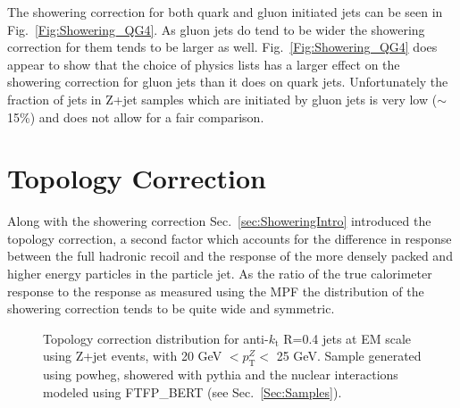 The showering correction for both quark and gluon initiated jets can be seen in Fig.~\ref{Fig:Showering_QG4}.  
As gluon jets do tend to be wider the showering correction for them tends to be larger as well.  
Fig.~\ref{Fig:Showering_QG4} does appear to show that the choice of physics lists has a larger effect on the showering correction for gluon jets than it does on quark jets.  
Unfortunately the fraction of jets in Z+jet samples which are initiated by gluon jets is very low ($\sim$15\%) and does not allow for a fair comparison.   


\section{Topology Correction}

Along with the showering correction Sec.~\ref{sec:ShoweringIntro} introduced the topology correction, a second factor which accounts for the difference in response between the full hadronic recoil and the response of the more densely packed and higher energy particles in the particle jet.  
As the ratio of the true calorimeter response to the response as measured using the MPF the distribution of the showering correction tends to be quite wide and symmetric.   


\begin{figure}[!ht]
 \begin{center}
 \end{center}
 \caption[Example topology correction distribution]
 {\small Topology correction distribution for anti-$k_{\mathrm t}$ R=0.4 jets at EM scale using Z+jet events, with 20 GeV $< p_{\mathrm T}^Z <$ 25 GeV.  Sample generated using {\sc powheg}, showered with {\sc pythia} and the nuclear interactions modeled using FTFP\_BERT (see Sec.~\ref{Sec:Samples}).   }
 \label{Fig:ShoweringDistExample}
\end{figure}


